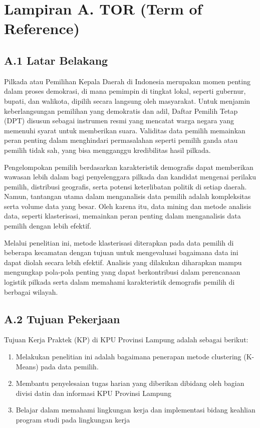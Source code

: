 \section*{\centering Lampiran A. TOR (Term of Reference) }


\setcounter{section}{0}
\setcounter{subsection}{0}  %
\setcounter{figure}{0}
\setcounter{table}{0}
\renewcommand{\thetable}{\thesection.\arabic{table}}

\subsection*{A.1 Latar Belakang}
Pilkada atau Pemilihan Kepala Daerah di Indonesia merupakan momen penting dalam proses demokrasi, di mana pemimpin di tingkat lokal, seperti gubernur, bupati, dan walikota, dipilih secara langsung oleh masyarakat. Untuk menjamin keberlangsungan pemilihan yang demokratis dan adil, Daftar Pemilih Tetap (DPT) disusun sebagai instrumen resmi yang mencatat warga negara yang memenuhi syarat untuk memberikan suara. Validitas data pemilih memainkan peran penting dalam menghindari permasalahan seperti pemilih ganda atau pemilih tidak sah, yang bisa mengganggu kredibilitas hasil pilkada.

Pengelompokan pemilih berdasarkan karakteristik demografis dapat memberikan wawasan lebih dalam bagi penyelenggara pilkada dan kandidat mengenai perilaku pemilih, distribusi geografis, serta potensi keterlibatan politik di setiap daerah. Namun, tantangan utama dalam menganalisis data pemilih adalah kompleksitas serta volume data yang besar. Oleh karena itu, data mining dan metode analisis data, seperti klasterisasi, memainkan peran penting dalam menganalisis data pemilih dengan lebih efektif.

Melalui penelitian ini, metode klasterisasi diterapkan pada data pemilih di beberapa kecamatan dengan tujuan untuk mengevaluasi bagaimana data ini dapat diolah secara lebih efektif. Analisis yang dilakukan diharapkan mampu mengungkap pola-pola penting yang dapat berkontribusi dalam perencanaan logistik pilkada serta dalam memahami karakteristik demografis pemilih di berbagai wilayah.

\subsection*{A.2 Tujuan Pekerjaan}
Tujuan Kerja Praktek (KP) di KPU Provinsi Lampung adalah sebagai berikut:
\begin{enumerate}
    \item Melakukan penelitian ini adalah bagaimana penerapan metode clustering (K-Means) pada data pemilih.
    \item Membantu penyelesaian tugas harian yang diberikan dibidang oleh bagian divisi datin dan informasi KPU Provinsi Lampung
    \item Belajar dalam memahami lingkungan kerja dan implementasi bidang keahlian program studi pada lingkungan kerja
\end{enumerate}

